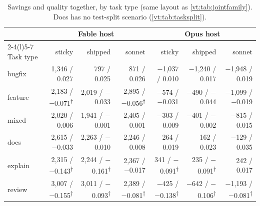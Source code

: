 \documentclass[11pt,letterpaper]{article}
\begin{document}
\begin{table}[tbp]
\centering\scriptsize
\caption{Savings and quality together, by task type (same layout as \cref{vt:tab:jointfamily}). Docs has no test-split
scenario (\cref{vt:tab:tasksplit}).}
\label{vt:tab:jointtask}
\begin{tabular*}{\textwidth}{@{\extracolsep{\fill}}l r r r r r r@{}}
\toprule
 & \multicolumn{3}{c}{Fable host} & \multicolumn{3}{c}{Opus host} \\
\cmidrule(lr){2-4}\cmidrule(l){5-7}
Task type & sticky & shipped & sonnet & sticky & shipped & sonnet \\
\midrule
bugfix & 1{,}346 / 0.027 & 797 / 0.025 & 871 / 0.026 & $-$1{,}037 / 0.010 & $-$1{,}240 / 0.017 & $-$1{,}948 / 0.019 \\
feature & 2{,}183 / $-$0.071\textsuperscript{$\dagger$} & 2{,}019 / $-$0.033 & 2{,}895 / $-$0.056\textsuperscript{$\dagger$} & $-$574 / $-$0.031 & $-$490 / $-$0.044 & $-$1{,}099 / $-$0.019 \\
mixed & 2{,}020 / 0.006 & 1{,}941 / $-$0.001 & 2{,}405 / 0.001 & $-$303 / 0.009 & $-$401 / $-$0.002 & $-$815 / 0.015 \\
docs & 2{,}615 / $-$0.033 & 2{,}263 / $-$0.010 & 2{,}246 / 0.008 & 264 / 0.019 & 162 / 0.023 & $-$129 / 0.035 \\
explain & 2{,}315 / $-$0.143\textsuperscript{$\dagger$} & 2{,}244 / $-$0.161\textsuperscript{$\dagger$} & 2{,}367 / $-$0.017 & 341 / $-$0.091\textsuperscript{$\dagger$} & 235 / $-$0.091\textsuperscript{$\dagger$} & 242 / 0.017 \\
review & 3{,}007 / $-$0.155\textsuperscript{$\dagger$} & 3{,}011 / $-$0.093\textsuperscript{$\dagger$} & 2{,}389 / $-$0.081\textsuperscript{$\dagger$} & $-$425 / $-$0.138\textsuperscript{$\dagger$} & $-$642 / $-$0.106\textsuperscript{$\dagger$} & $-$1{,}193 / $-$0.081\textsuperscript{$\dagger$} \\
\bottomrule
\end{tabular*}
 \end{table}
\end{document}
